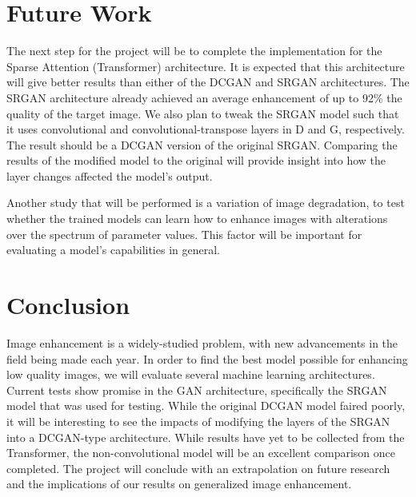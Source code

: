 \documentclass[letterpaper]{article} %
\begin{document}
\section{Future Work}
The next step for the project will be to complete the implementation for the
Sparse Attention (Transformer) architecture. It is expected that this architecture
will give better results than either of the DCGAN and SRGAN architectures.
The SRGAN architecture already achieved an average enhancement of up to 92\%
the quality of the target image.
We also plan to tweak the SRGAN model such that it uses
convolutional and convolutional-transpose layers in D and G, respectively.
The result should be a DCGAN version of the original SRGAN.
Comparing the results of the modified model to the original will provide
insight into how the layer changes affected the model's output.

Another study that will be performed is a variation of image degradation,
to test whether the trained models can learn how to enhance images with alterations
over the spectrum of parameter values.
This factor will be important for evaluating a model's
capabilities in general.

\section{Conclusion}
Image enhancement is a widely-studied problem, with new advancements in the field
being made each year.
In order to find the best model possible for enhancing low quality images,
we will evaluate several machine learning architectures.
Current tests show promise in the GAN architecture,
specifically the SRGAN model that was used for testing.
While the original DCGAN model faired poorly, it will be interesting to see the
impacts of modifying the layers of the SRGAN into a DCGAN-type architecture.
While results have yet to be collected from the Transformer,
the non-convolutional model will be an excellent comparison once completed.
The project will conclude with an extrapolation on future research
and the implications of our results on generalized image enhancement.




\end{document}
